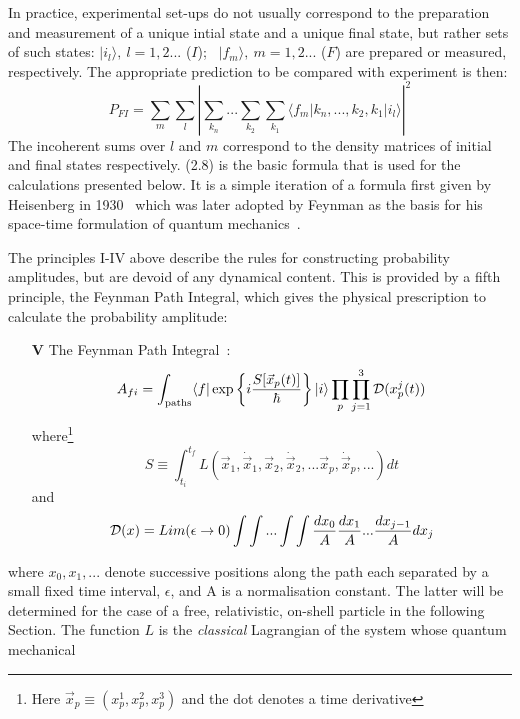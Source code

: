 \documentclass [12pt]{article}
\begin{document}
{  \par In practice, experimental set-ups do not usually correspond to the preparation
   and measurement of a unique intial state and a unique final state, but rather sets of
    such states: $|i_l\rangle,~l =1,2...$ ($I$);~  $|f_m\rangle,~m =1,2...$ ($F$) are
   prepared or measured, respectively. The appropriate prediction to be compared with
   experiment is then:
   \begin{equation} 
      P_{FI} = \sum_m  \sum_l\left| \sum_{k_n}...\sum_{k_2}\sum_{k_1}
      \langle f_m|k_n,...,k_2,k_1|i_l \rangle\right|^2
    \end{equation}
  The incoherent sums over $l$  and $m$  correspond to the density matrices of 
   initial and final states respectively.
   (2.8) is the basic formula that is used for the calculations presented below. It is
    a simple iteration of a formula first given by Heisenberg in 1930~\cite{Heis1}
   which was later adopted by Feynman as the basis for his space-time formulation
   of quantum mechanics~\cite{Feyn5}.
     \par The principles I-IV above describe the rules for constructing probability
     amplitudes, but are devoid of any dynamical content. This is provided by a fifth
     principle, the Feynman Path Integral, which gives the physical prescription
    to calculate the probability amplitude:
  \begin{itemize}
  \item[{\bf V}]  The Feynman Path Integral~\cite{FPI}:
   \begin{equation}   
     A_{fi} = \int_{\rm paths} \langle f|\exp\left\{i \frac{S[\vec{x}_p(t)]}{\hbar}\right\}
     | i\rangle \prod_p \prod_{j=1}^3 {\cal D}(x_p^j(t))
    \end{equation}
     where\footnote{Here $\vec{x}_p \equiv (x_p^1,x_p^2,x_p^3)$
    and the dot denotes a time derivative} 
    \[ S \equiv \int_{t_i}^{t_f} L(\vec{x}_1, \dot{\vec{x}}_1,\vec{x}_2,\dot{\vec{x}}_2,...
   \vec{x}_p,\dot{\vec{x}}_p,...) dt \]
    and
    \[ {\cal D}(x) = Lim(\epsilon \rightarrow 0) \int \int ...\int \int\frac{dx_0}{A}
      \frac{dx_1}{A}... \frac{dx_{j-1}}{A} dx_j \]
    \end{itemize}
     where $x_0,x_1,...$ denote successive positions along the
     path each separated by a small fixed time interval, $\epsilon$,  and  A is a normalisation constant.
     The latter will be determined for the case of a 
      free, relativistic, on-shell particle in the following Section. 
     The function $L$ is the {\it classical} Lagrangian of the system whose quantum mechanical
}
\end{document}
